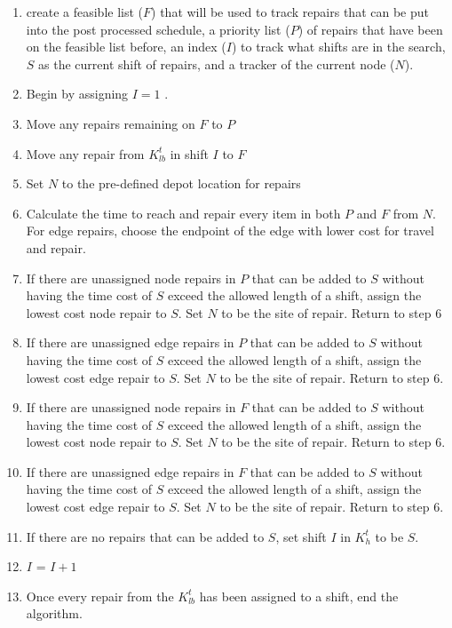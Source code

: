 \begin{enumerate}
	\item create a feasible list ($F$) that will be used to track repairs that can be put into the post processed schedule, a priority list ($P$) of repairs that have been on the feasible list before, an index ($I$) to track what shifts are in the search, $S$ as the current shift of repairs, and a tracker of the current node ($N$).
	\item Begin by assigning $I=1$ .
	\item Move any repairs remaining on $F$ to $P$
	\item Move any repair from $K_{lb}^t$ in shift $I$ to $F$
	\item Set $N$ to the pre-defined depot location for repairs
	\item Calculate the time to reach and repair every item in both $P$ and $F$ from $N$. For edge repairs, choose the endpoint of the edge with lower cost for travel and repair.
	\item If there are unassigned node repairs in $P$ that can be added to $S$ without having the time cost of $S$ exceed the allowed length of a shift, assign the lowest cost node repair to $S$. Set $N$ to be the site of repair. Return to step 6 
	\item If there are unassigned edge repairs in $P$ that can be added to $S$ without having the time cost of $S$ exceed the allowed length of a shift, assign the lowest cost edge repair to $S$. Set $N$ to be the site of repair. Return to step 6.
	\item If there are unassigned node repairs in $F$ that can be added to $S$ without having the time cost of $S$ exceed the allowed length of a shift, assign the lowest cost node repair to $S$. Set $N$ to be the site of repair. Return to step 6.
	\item If there are unassigned edge repairs in $F$ that can be added to $S$ without having the time cost of $S$ exceed the allowed length of a shift, assign the lowest cost edge repair to $S$. Set $N$ to be the site of repair. Return to step 6. 
	\item If there are no repairs that can be added to $S$, set shift $I$ in $K_h^t$ to be $S$. 
	\item $I$ = $I+1$
	\item Once every repair from the $K_{lb}^t$ has been assigned to a shift, end the algorithm.
\end{enumerate}

